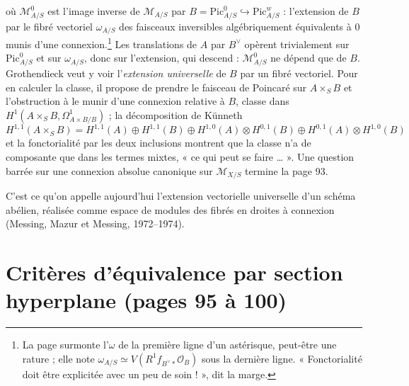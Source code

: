 \documentclass[11pt,a4paper]{article}
\begin{document}

où $\mathcal{M}^0_{A/S}$ est l'image inverse de $\mathcal{M}_{A/S}$ par
$B = \mathrm{Pic}^0_{A/S} \hookrightarrow \mathrm{Pic}^w_{A/S}$ : l'extension de
$B$ par le fibré vectoriel $\omega_{A/S}$ des faisceaux inversibles
algébriquement équivalents à $0$ munis d'une connexion.\footnote{La page
surmonte l'$\omega$ de la première ligne d'un astérisque, peut-être une
rature ; elle note
$\omega_{A/S} \simeq V(R^1 f_{B^\vee *}\mathcal{O}_B)$ sous la dernière ligne.
« Fonctorialité doit être explicitée avec un peu de soin ! », dit la marge.}
Les translations de $A$ par $B^\vee$ opèrent trivialement sur
$\mathrm{Pic}^0_{A/S}$ et sur $\omega_{A/S}$, donc sur l'extension, qui descend :
$\mathcal{M}^0_{A/S}$ ne dépend que de $B$. Grothendieck veut y voir
l'\emph{extension universelle} de $B$ par un fibré vectoriel. Pour en calculer
la classe, il propose de prendre le faisceau de Poincaré sur $A \times_S B$ et
l'obstruction à le munir d'une connexion relative à $B$, classe dans
$H^1(A \times_S B, \Omega^1_{A \times B/B})$ ; la décomposition de Künneth
\[
H^{1,1}(A \times_S B) = H^{1,1}(A) \oplus H^{1,1}(B) \oplus H^{1,0}(A) \otimes H^{0,1}(B) \oplus H^{0,1}(A) \otimes H^{1,0}(B)
\]
et la fonctorialité par les deux inclusions montrent que la classe n'a de
composante que dans les termes mixtes, « ce qui peut se faire … ». Une question
barrée sur une connexion absolue canonique sur $\mathcal{M}_{X/S}$ termine la
page 93.

C'est ce qu'on appelle aujourd'hui l'extension vectorielle universelle d'un
schéma abélien, réalisée comme espace de modules des fibrés en droites à
connexion (Messing, Mazur et Messing, 1972--1974).

\section*{Critères d'équivalence par section hyperplane (pages 95 à 100)}
\end{document}
